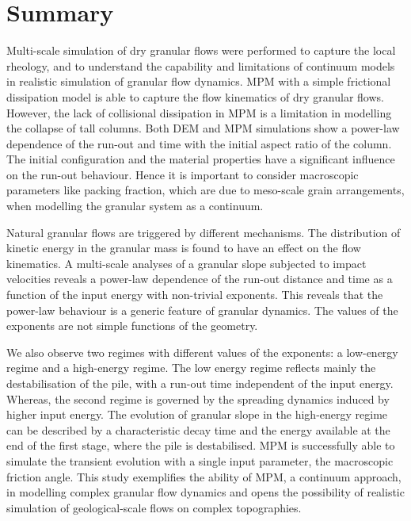 \section{Summary}

Multi-scale simulation of dry granular flows were performed to capture the 
local rheology, and to understand the capability and limitations of continuum 
models in realistic simulation of granular flow dynamics. MPM with a simple 
frictional dissipation model is able to capture the flow kinematics of dry 
granular flows. However, the lack of collisional dissipation in MPM is a 
limitation in modelling the collapse of tall columns. Both DEM and MPM 
simulations show a power-law dependence of the run-out and time with the 
initial aspect ratio of the column. The initial configuration and the material 
properties have a significant influence on the run-out behaviour. Hence it is 
important to consider macroscopic parameters like packing fraction, which are 
due to meso-scale grain arrangements, when modelling the granular system as a 
continuum.

Natural granular flows are triggered by different mechanisms. The distribution 
of kinetic energy in the granular mass is found to have an effect on the flow 
kinematics. A multi-scale analyses of a granular slope subjected to impact 
velocities reveals a power-law dependence of the run-out distance and time as a 
function of the input energy with non-trivial exponents. This reveals that the 
power-law behaviour is a generic feature of granular dynamics. The values of 
the exponents are not simple functions of the geometry. 

We also observe two regimes with different values of the exponents: 
a low-energy regime and a high-energy regime. The low energy regime reflects 
mainly the destabilisation of the pile, with a run-out time independent of the 
input energy. Whereas, the second regime is governed by the spreading dynamics 
induced by higher input energy. The evolution of granular slope in the 
high-energy regime can be described by a characteristic decay time and the 
energy available at the end of the first stage, where the pile is destabilised. 
MPM is successfully able to simulate the transient evolution with a single 
input parameter, the macroscopic friction angle. This study exemplifies the 
ability of MPM, a continuum approach,  in modelling complex granular flow 
dynamics and opens the possibility of realistic simulation of geological-scale 
flows on complex topographies.
